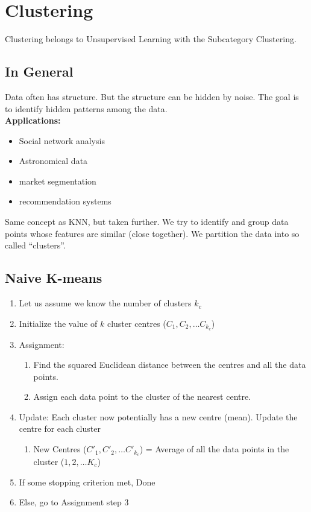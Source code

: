 \section{Clustering}
Clustering belongs to Unsupervised Learning with the Subcategory Clustering.

\subsection{In General}
Data often has structure. 
But the structure can be hidden by noise.
The goal is to identify hidden patterns among the data.\\
\textbf{Applications:}
\begin{itemize}
  \item Social network analysis
  \item Astronomical data
  \item market segmentation
  \item recommendation systems
\end{itemize}
Same concept as KNN, but taken further.
We try to identify and group data points whose features are similar (close together).
We partition the data into so called ``clusters''.

\subsection{Naive K-means}
\begin{enumerate}
  \item Let us assume we know the number of clusters $k_c$
  \item Initialize the value of $k$ cluster centres ($C_1,C_2,\dots C_{k_c}$)
  \item Assignment:
  \begin{enumerate}
    \item Find the squared Euclidean distance between the centres and all the data points.
    \item Assign each data point to the cluster of the nearest centre.
  \end{enumerate}
  \item Update: Each cluster now potentially has a new centre (mean). Update the centre for each cluster
  \begin{enumerate}
    \item New Centres ($C'_1,C'_2,\dots C'_{k_c}$) = Average of all the data points in the cluster ($1,2, \dots K_c$)
  \end{enumerate}
  \item If some stopping criterion met, Done
  \item Else, go to Assignment step 3
\end{enumerate}

